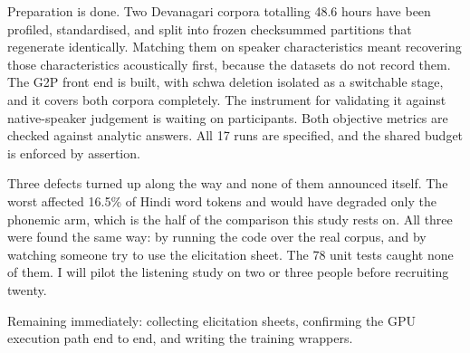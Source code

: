 \documentclass[12pt,a4paper]{article}
\begin{document}
Preparation is done. Two Devanagari corpora totalling 48.6 hours have been
profiled, standardised, and split into frozen checksummed partitions that
regenerate identically. Matching them on speaker characteristics meant
recovering those characteristics acoustically first, because the datasets do
not record them. The G2P front end is built, with schwa deletion isolated as a
switchable stage, and it covers both corpora completely. The instrument for
validating it against native-speaker judgement is waiting on participants. Both
objective metrics are checked against analytic answers. All 17 runs are
specified, and the shared budget is enforced by assertion.

Three defects turned up along the way and none of them announced itself. The
worst affected 16.5\% of Hindi word tokens and would have degraded only the
phonemic arm, which is the half of the comparison this study rests on. All
three were found the same way: by running the code over the real corpus, and by
watching someone try to use the elicitation sheet. The 78 unit tests caught
none of them. I will pilot the listening study on two or three people before
recruiting twenty.

Remaining immediately: collecting elicitation sheets, confirming the GPU
execution path end to end, and writing the training wrappers.

\end{document}
